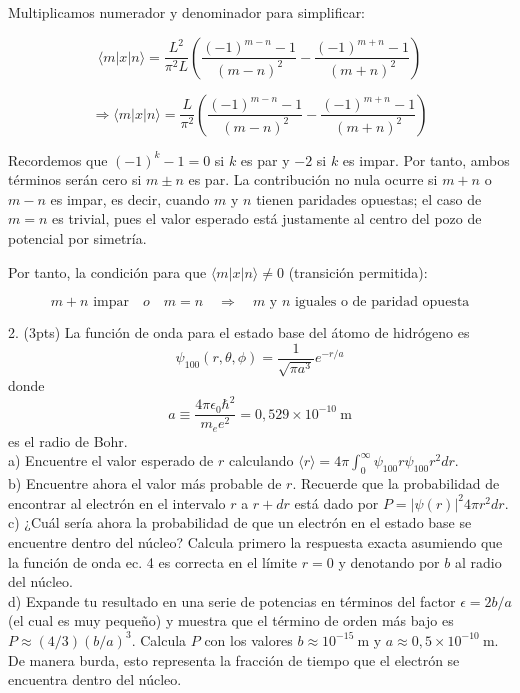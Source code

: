\documentclass{article}
\theoremstyle{nonumberplain}
\begin{document}
Multiplicamos numerador y denominador para simplificar:

$$
\langle m | x | n \rangle = \frac{L^2}{\pi^2 L} \left( \frac{(-1)^{m-n} - 1}{(m - n)^2} - \frac{(-1)^{m+n} - 1}{(m + n)^2} \right)
$$

$$
\Rightarrow 
\langle m | x | n \rangle = \frac{L}{\pi^2} \left( \frac{(-1)^{m-n} - 1}{(m - n)^2} - \frac{(-1)^{m+n} - 1}{(m + n)^2} \right)
$$

Recordemos que $(-1)^k - 1 = 0$ si $k$ es par y $-2$ si $k$ es impar. Por tanto, ambos términos serán cero si $m \pm n$ es par. La contribución no nula ocurre si $m+n$ o $m-n$ es impar, es decir, cuando $m$ y $n$ tienen paridades opuestas; el caso de $m=n$ es trivial, pues el valor esperado está justamente al centro del pozo de potencial por simetría.

Por tanto, la condición para que $\langle m | x | n \rangle \neq 0$ (transición permitida):

$$
m + n \text{ impar} \quad o \quad m=n \quad \Rightarrow \quad m \text{ y } n \text{ iguales o de paridad opuesta}
$$


2. (3pts) La función de onda para el estado base del átomo de hidrógeno es
\[
\psi_{100}(r, \theta, \phi)=\frac{1}{\sqrt{\pi a^{3}}} e^{-r / a}
\]
donde
\[
a \equiv \frac{4 \pi \epsilon_{0} \hbar^{2}}{m_{e} e^{2}}=0,529 \times 10^{-10} \mathrm{~m}
\]
es el radio de Bohr. \\
a) Encuentre el valor esperado de \( r \) calculando \( \langle r\rangle=4 \pi \int_{0}^{\infty} \psi_{100}^{} r \psi_{100} r^{2} d r \). \\
b) Encuentre ahora el valor más probable de \( r \). Recuerde que la probabilidad de encontrar al electrón en el intervalo \( r \) a \( r+d r \) está dado por \( P=|\psi(r)|^{2} 4 \pi r^{2} d r \). \\
c) ¿Cuál sería ahora la probabilidad de que un electrón en el estado base se encuentre dentro del núcleo? Calcula primero la respuesta exacta asumiendo que la función de onda ec. 4 es correcta en el límite \( r=0 \) y denotando por \( b \) al radio del núcleo. \\
d) Expande tu resultado en una serie de potencias en términos del factor \( \epsilon=2 b / a \) (el cual es muy pequeño) y muestra que el término de orden más bajo es \( P \approx(4 / 3)(b / a)^{3} \). Calcula \( P \) con los valores \( b \approx 10^{-15} \mathrm{~m} \) y \( a \approx 0,5 \times 10^{-10} \mathrm{~m} \). De manera burda, esto representa la fracción de tiempo que el electrón se encuentra dentro del núcleo. \\
\end{document}
